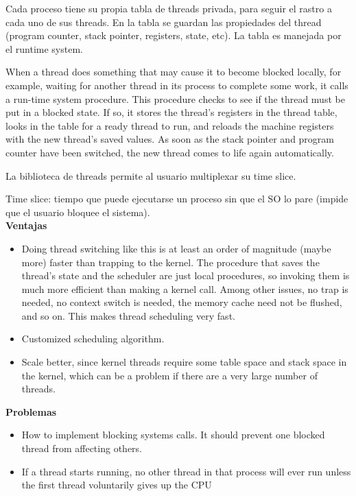 \documentclass[a4paper, twoside]{article}
\begin{document}
Cada proceso tiene su propia tabla de threads privada, para seguir el rastro a cada uno de sus threads. En la tabla se guardan las propiedades del thread (program counter, stack pointer, registers, state, etc). La tabla es manejada por el runtime system.

When a thread does something that may cause it to become blocked locally, for example, waiting for another thread in its process to complete some work, it calls a run-time system procedure. This procedure checks to see if the thread must be put in a blocked state. If so, it stores the thread’s registers in the thread table, looks in the table for a ready thread to run, and reloads the machine registers with the new thread’s saved values. As soon as the stack pointer and program counter have been switched, the new thread comes to life again automatically.

La biblioteca de threads permite al usuario multiplexar su time slice.

Time slice: tiempo que puede ejecutarse un proceso sin que el SO lo pare (impide que el usuario bloquee el sistema).\\

\textbf{Ventajas}
\begin{itemize}
	\item Doing thread switching like this is at least an order of magnitude (maybe more) faster than trapping to the kernel. The procedure that saves the thread’s state and the scheduler are just local procedures, so invoking them is much more efficient than making a kernel call. Among other issues, no trap is needed, no context switch is needed, the memory cache need not be flushed, and so on. This makes thread scheduling very fast.
	\item Customized scheduling algorithm.
	\item Scale better, since kernel threads require some table space and stack space in the kernel, which can be a problem if there are a very large number of threads.
\end{itemize}

\textbf{Problemas}
\begin{itemize}
	\item How to implement blocking systems calls. It should prevent one blocked thread from affecting others.
	\item If a thread starts running, no other thread in that process will ever run unless the first thread voluntarily gives up the CPU
\end{itemize}
\end{document}
